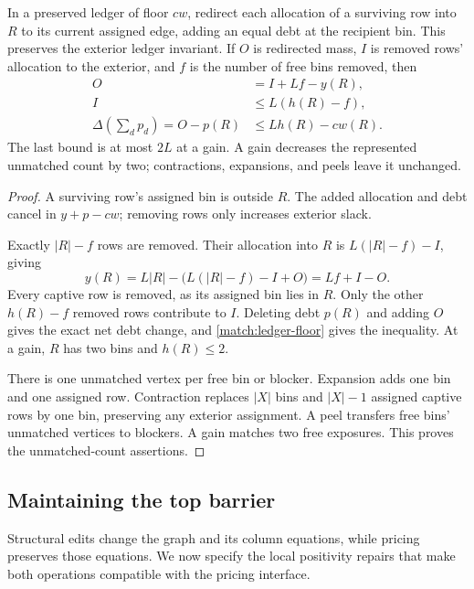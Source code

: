 \begin{lemma}
\label{match:deletion}
In a preserved ledger of floor \(cw\), redirect each allocation of
a surviving row into \(R\) to its current assigned edge, adding an
equal debt at the recipient bin.  This preserves the exterior
ledger invariant.  If \(O\) is redirected mass, \(I\) is removed
rows' allocation to the exterior, and \(f\) is the number of free
bins removed, then
\begin{equation}
 \begin{split}
 O&=I+Lf-y(R),\\
 I&\le L(h(R)-f),\\
 \Delta\!\left(\sum_d p_d\right)=O-p(R)&\le Lh(R)-cw(R).
 \end{split}
 \label{match:deletion-debt}
\end{equation}
The last bound is at most \(2L\) at a gain.
A gain decreases the represented unmatched count by two;
contractions, expansions, and peels leave it unchanged.
\end{lemma}
\begin{proof}
A surviving row's assigned bin is outside \(R\).
The added allocation and debt cancel in \(y+p-cw\);
removing rows only increases exterior slack.

Exactly \(|R|-f\) rows are removed.  Their allocation into \(R\)
is \(L(|R|-f)-I\), giving
\[
 y(R)=L|R|-\bigl(L(|R|-f)-I+O\bigr)=Lf+I-O.
\]
Every captive row is removed, as its assigned bin lies in \(R\).
Only the other \(h(R)-f\) removed rows contribute to \(I\).
Deleting debt \(p(R)\) and adding \(O\) gives the exact net debt
change, and \eqref{match:ledger-floor} gives the inequality.
At a gain, \(R\) has two bins and \(h(R)\le2\).

There is one unmatched vertex per free bin or blocker.
Expansion adds one bin and one assigned row.  Contraction replaces
\(|X|\) bins and \(|X|-1\) assigned captive rows by one bin,
preserving any exterior assignment.  A peel transfers free bins'
unmatched vertices to blockers.  A gain matches two free exposures.
This proves the unmatched-count assertions.
\end{proof}

\subsection{Maintaining the top barrier}

Structural edits change the graph and its column equations, while pricing
preserves those equations.  We now specify the local positivity repairs
that make both operations compatible with the pricing interface.

